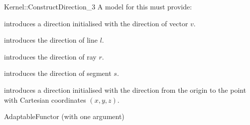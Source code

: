 \begin{ccRefFunctionObjectConcept}{Kernel::ConstructDirection_3}
A model for this must provide:


            {introduces a direction  initialised with the 
             direction of vector $v$.}

            {introduces the direction of line $l$.}

            {introduces the direction of ray $r$.}

            {introduces the direction of segment $s$.}

\ccHidden{}
            {introduces a direction  initialised with the direction 
             from the origin to the point with Cartesian coordinates $(x, y, z)$.}

\ccRefines
AdaptableFunctor (with one argument)

\ccSeeAlso

  \\

\end{ccRefFunctionObjectConcept}
